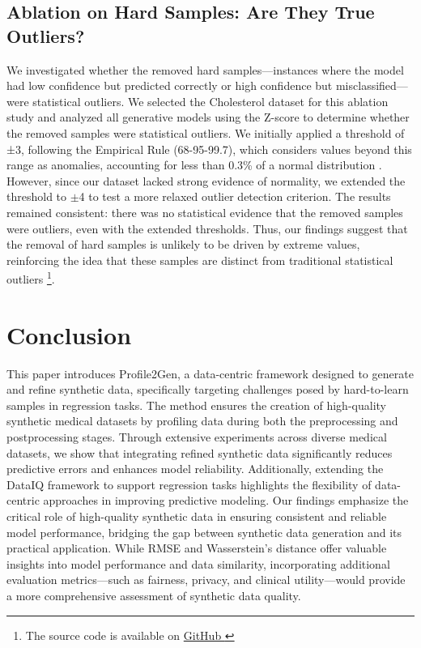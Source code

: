 \documentclass{article}
\theoremstyle{plain}
\theoremstyle{definition}
\theoremstyle{remark}
\begin{document}
\subsection{Ablation on Hard Samples: Are They True Outliers? }


We investigated whether the removed hard samples—instances where the model had low confidence but predicted correctly or high confidence but misclassified—were statistical outliers.
We selected the Cholesterol dataset for this ablation study and analyzed all generative models using the Z-score to determine whether the removed samples were statistical outliers. We initially applied a threshold of ±3, following the Empirical Rule (68-95-99.7), which considers values beyond this range as anomalies, accounting for less than 0.3\% of a normal distribution \cite{TACQ2010467}. However, since our dataset lacked strong evidence of normality, we extended the threshold to $\pm$4 to test a more relaxed outlier detection criterion. The results remained consistent: there was no statistical evidence that the removed samples were outliers, even with the extended thresholds.  Thus, our findings suggest that the removal of hard samples is unlikely to be driven by extreme values, reinforcing the idea that these samples are distinct from traditional statistical outliers \footnote{The source code is available on \href{https://github.com/szanara/profile2gen.git}{GitHub }}.


\section{Conclusion}

This paper introduces Profile2Gen, a data-centric framework designed to generate and refine synthetic data, specifically targeting challenges posed by hard-to-learn samples in regression tasks. The method ensures the creation of high-quality synthetic medical datasets by profiling data during both the preprocessing and postprocessing stages. Through extensive experiments across diverse medical datasets, we show that integrating refined synthetic data significantly reduces predictive errors and enhances model reliability. Additionally, extending the DataIQ framework to support regression tasks highlights the flexibility of data-centric approaches in improving predictive modeling. Our findings emphasize the critical role of high-quality synthetic data in ensuring consistent and reliable model performance, bridging the gap between synthetic data generation and its practical application. While RMSE and Wasserstein's distance offer valuable insights into model performance and data similarity, incorporating additional evaluation metrics—such as fairness, privacy, and clinical utility—would provide a more comprehensive assessment of synthetic data quality.
    
\end{document}
